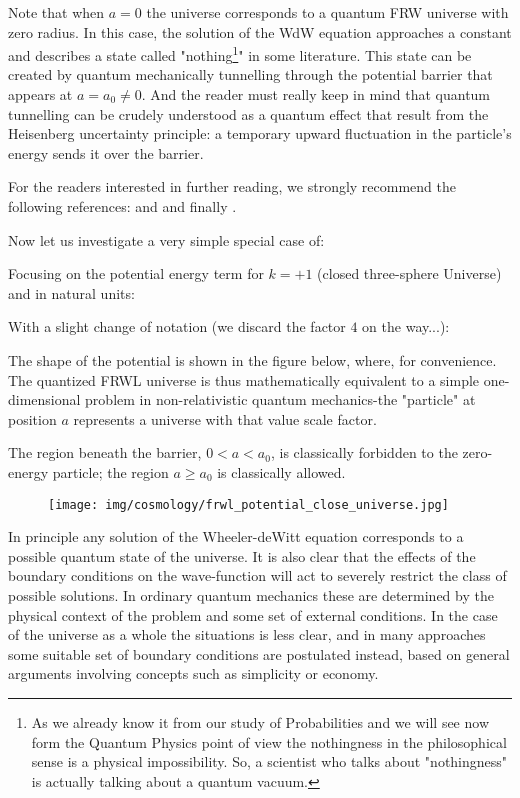 	Note that when $a=0$ the universe corresponds to a quantum FRW universe with zero radius. In this case, the solution of the WdW equation approaches a constant and describes a state called "nothing\footnote{As we already know it from our study of Probabilities and we will see now form the Quantum Physics point of view the nothingness in the philosophical sense is a physical impossibility. So, a scientist who talks about "nothingness" is actually talking about a quantum vacuum.}" in some literature. This state can be created by quantum mechanically  tunnelling through the potential barrier that appears at $a=a_{0} \neq 0$. And the reader must really keep in mind that quantum tunnelling can be crudely understood as a quantum effect that result from the Heisenberg uncertainty principle: a temporary upward fluctuation in the particle's energy sends it over the barrier.
	
	\begin{tcolorbox}[title=Remark,colframe=black,arc=10pt]
	For the readers interested in further reading, we strongly recommend the following references: \cite{vieira2016class} and \cite{kolb2018early} and finally \cite{vieira2015quantum}.
	\end{tcolorbox}
	Now let us investigate a very simple special case of:
	
	Focusing on the potential energy term for $k=+1$ (closed three-sphere Universe) and in natural units:
	
	With a slight change of notation (we discard the factor $4$ on the way...):
	
	The shape of the potential is shown in the figure below, where, for convenience. The quantized FRWL universe is thus mathematically equivalent to a simple one-dimensional problem in non-relativistic quantum mechanics-the "particle" at position $a$ represents a universe with that value scale factor.

	The region beneath the barrier, $0<a<a_0$, is classically forbidden to the zero-energy particle; the region $a\geq a_0$ is classically allowed.
	\begin{figure}[H]
		\centering
		\texttt{[image: img/cosmology/frwl\_potential\_close\_universe.jpg]}
	\end{figure}
	In principle any solution of the Wheeler-deWitt equation corresponds to a possible quantum state of the universe. It is also clear that the effects of the boundary conditions on the wave-function will act to severely restrict the class of possible solutions. In ordinary quantum mechanics these are determined by the physical context of the problem and some set of external conditions. In the case of the universe as a whole the situations is less clear, and in many approaches some suitable set of boundary conditions are postulated instead, based on general arguments involving concepts such as simplicity or economy.
	
